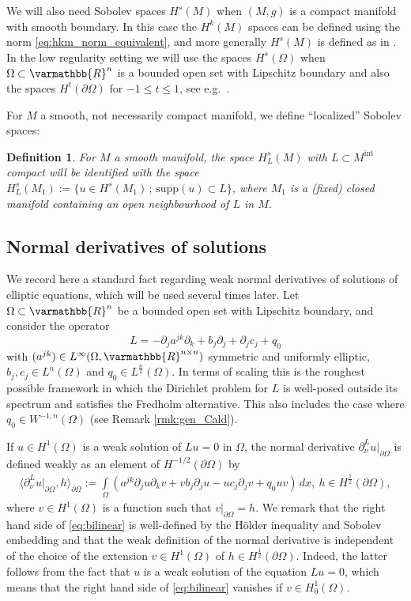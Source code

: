 \documentclass[12pt,twoside]{amsart}
\numberwithin{equation}{section}
\renewcommand{\leq}{\leqslant}
\renewcommand{\mathbb}{\varmathbb}
\newtheorem{definition}[theorem]{Definition}
\newcommand {\R} {\mathbb{R}} \newcommand {\Z} {\mathbb{Z}}
\newcommand {\p} {\partial}
\newcommand{\mR}{\mathbb{R}}                    %
\newcommand{\supp}{\mathrm{supp}}
\begin{document}
We will also need Sobolev spaces $H^s(M)$ when $(M,g)$ is a compact manifold with smooth boundary. In this case the $H^k(M)$ spaces can be defined using the norm \eqref{eq:hkm_norm_equivalent}, and more generally $H^s(M)$ is defined as in \cite[Section 4.4 in vol.\ I]{Taylor}. In the low regularity setting we will use the spaces $H^s(\Omega)$ when $\Omega \subset \mR^n$ is a bounded open set with Lipschitz boundary and also the spaces $H^t(\p \Omega)$ for $-1 \leq t \leq 1$, see e.g.\ \cite{McLean}.


For $M$ a smooth, not necessarily compact manifold, we define ``localized'' Sobolev spaces:

\begin{definition}
\label{def:loc_Hs}
For $M$ a smooth manifold, the space $H^s_L(M)$ with $L \subset M^{\text{int}}$ compact will be identified with the space $H^s_L(M_1):=\{u\in H^s(M_1) \,;\, \supp(u)\subset L\}$, where $M_1$ is a (fixed) closed manifold containing an open neighbourhood of $L$ in $M$.
\end{definition}

\subsection{Normal derivatives of solutions} \label{subseq_nd}

We record here a standard fact regarding weak normal derivatives of solutions of elliptic equations, which will be used several times later. Let $\Omega \subset \mR^n$ be a bounded open set with Lipschitz boundary, and consider the operator 
\[
L = - \p_j a^{jk} \p_k + b_j \p_j + \p_j c_j + q_0
\]
with $(a^{jk}) \in L^{\infty}(\Omega, \R^{n\times n})$ symmetric and uniformly elliptic, $b_j, c_j \in L^{n}(\Omega)$ and $q_0 \in L^{\frac{n}{2}}(\Omega)$. In terms of scaling this is the roughest possible framework in which the Dirichlet problem for $L$ is well-posed outside its spectrum and satisfies the Fredholm alternative. This also includes the case where $q_0 \in W^{-1,n}(\Omega)$ (see Remark \ref{rmk:gen_Cald}).

If $u \in H^1(\Omega)$ is a weak solution of $Lu = 0$ in $\Omega$, the normal derivative $\p_{\nu}^L u|_{\p \Omega}$ is defined weakly as an element of $H^{-1/2}(\p \Omega)$ by
\begin{align} 
\label{eq:bilinear}
\langle \p_{\nu}^L u|_{\p \Omega}, h \rangle_{\partial \Omega}:=
\int\limits_{\Omega} (a^{jk} \p_j u \p_k v + v b_j \p_j u - u c_j \p_j v + q_0 u v) \,dx, \ h \in H^{\frac{1}{2}}(\partial \Omega),
\end{align}
where $v \in H^1(\Omega)$ is a function such that $v|_{\partial \Omega} = h$. We remark that the right hand side of \eqref{eq:bilinear} is well-defined by the H{\"o}lder inequality and Sobolev embedding and that the weak definition of the normal derivative is independent of the choice of the extension $v \in H^{1}(\Omega)$ of $h \in H^{\frac{1}{2}}(\partial \Omega)$. Indeed, the latter follows from the fact that $u$ is a weak solution of the equation $Lu = 0$, which means that the right hand side of \eqref{eq:bilinear} vanishes if $v \in H^1_0(\Omega)$.
\end{document}
